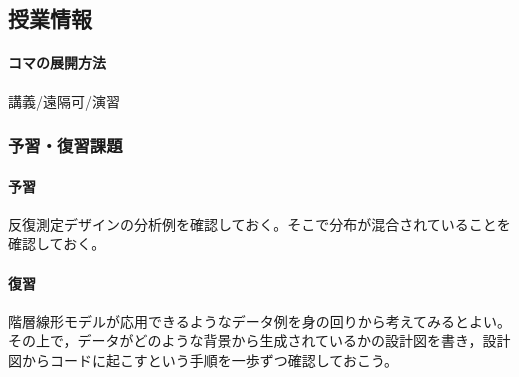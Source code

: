 \subsection{授業情報}
\paragraph{コマの展開方法}
講義/遠隔可/演習
\subsubsection{予習・復習課題}
\paragraph{予習}反復測定デザインの分析例を確認しておく。そこで分布が混合されていることを確認しておく。
\paragraph{復習}階層線形モデルが応用できるようなデータ例を身の回りから考えてみるとよい。その上で，データがどのような背景から生成されているかの設計図を書き，設計図からコードに起こすという手順を一歩ずつ確認しておこう。